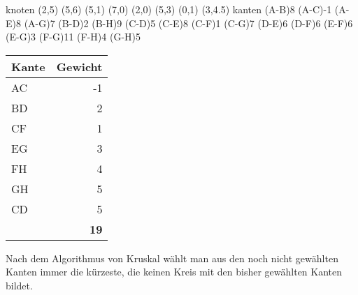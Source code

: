 \documentclass{lehramt-informatik-aufgabe}
\begin{document}
\begin{minipage}{8cm}
\graph knoten {
  (2,5)
  (5,6)
  (5,1)
  (7,0)
  (2,0)
  (5,3)
  (0,1)
  (3,4.5)
} kanten {
  \kante(A-B){8}
  \KANTE(A-C){-1}
  \kante(A-E){8}
  \kante(A-G){7}
  \KANTE(B-D){2}
  \kante(B-H){9}
  \KANTE(C-D){5}
  \kante(C-E){8}
  \KANTE(C-F){1}
  \kante(C-G){7}
  \kante(D-E){6}
  \kante(D-F){6}
  \kante(E-F){6}
  \KANTE(E-G){3}
  \kante(F-G){11}
  \KANTE(F-H){4}
  \KANTE(G-H){5}
}
\end{minipage}
\begin{minipage}{4cm}
\begin{tabular}{lr}
Kante & Gewicht \\
\hline
AC & -1 \\
BD & 2 \\
CF & 1 \\
EG & 3 \\
FH & 4 \\
GH & 5 \\
CD & 5 \\\hline
& \textbf{19} \\
\end{tabular}
\end{minipage}

Nach dem Algorithmus von Kruskal wählt man aus den noch nicht gewählten
Kanten immer die kürzeste, die keinen Kreis mit den bisher gewählten
Kanten bildet.
\end{document}
